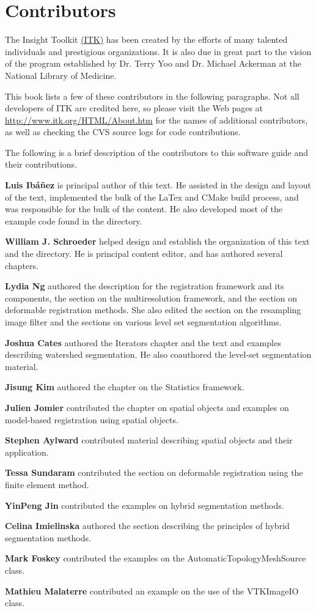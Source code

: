 \chapter*{Contributors}
\noindent

The Insight Toolkit \href{http://www.itk.org}{(ITK)} has been created by the
efforts of many talented individuals and prestigious organizations. It is also
due in great part to the vision of the program established by Dr. Terry Yoo
and Dr. Michael Ackerman at the National Library of Medicine.

This book lists a few of these contributors in the following paragraphs. Not
all developers of ITK are credited here, so please visit the Web pages at
\href{http://www.itk.org/HTML/About.htm}{http://www.itk.org/HTML/About.htm} 
for the names of additional contributors, as well as checking the CVS source
logs for code contributions.

The following is a brief description of the contributors to this software
guide and their contributions.

{\bf Luis Ib\'{a}\~{n}ez} is principal author of this text.
He assisted in the design and layout of the text, implemented the bulk of
the LaTex and CMake build process, and was responsible for the bulk of 
the content. He also developed most of the example code found in the
 directory.

{\bf William J. Schroeder} helped design and establish the organization 
of this text and the  directory. He is principal 
content editor, and has authored several chapters.

{\bf Lydia Ng} authored the description for the registration framework
and its components, the section on the multiresolution framework, and
the section on deformable registration methods. She also edited the
section on the resampling image filter and the sections on various
level set segmentation algorithms.

{\bf Joshua Cates} authored the Iterators chapter and the text and examples
describing watershed segmentation. He also coauthored the level-set segmentation
material.

{\bf Jisung Kim} authored the chapter on the Statistics framework.

{\bf Julien Jomier} contributed the chapter on spatial objects and examples on
model-based registration using spatial objects.

{\bf Stephen Aylward}  contributed material describing spatial objects and
their application.

{\bf Tessa Sundaram} contributed the section on deformable registration using
the finite element method.

{\bf YinPeng Jin} contributed the examples on  hybrid segmentation methods. 

{\bf Celina Imielinska} authored the section describing the principles of
hybrid segmentation methods.

{\bf Mark Foskey} contributed the examples on the
AutomaticTopologyMeshSource class.

{\bf Mathieu Malaterre} contributed an example on the use of the VTKImageIO class.



